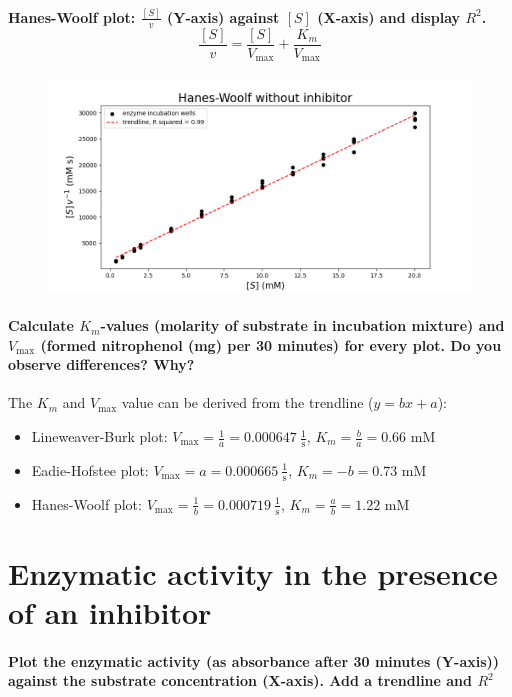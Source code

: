 \documentclass[a4paper,12pt]{article}
\begin{document}
\paragraph{Hanes-Woolf plot: $\frac{[S]}{v}$ (Y-axis) against $[S]$ (X-axis) and display $R^2$. \[\frac{[S]}{v}=\frac{[S]}{V_{\text{max}}}+\frac{K_m}{V_{\text{max}}}\]}

\begin{figure}[htb]
    \includegraphics[scale=0.4]{fig2_4.png}
    \centering
\end{figure}

\paragraph{Calculate $K_m$-values (molarity of substrate in incubation mixture) and $V_{\text{max}}$ (formed nitrophenol (mg) per 30 minutes) for every plot. Do you observe 
differences? Why?}

The $K_m$ and $V_{\text{max}}$ value can be derived from the trendline ($y = bx+a$):
\begin{itemize}
\item Lineweaver-Burk plot: $V_{\text{max}} = \frac{1}{a} = 0.000647\: \frac{1}{\text{s}}$, $K_m = \frac{b}{a} = 0.66$ mM
\item Eadie-Hofstee plot: $V_{\text{max}} = a = 0.000665\: \frac{1}{\text{s}}$, $K_m = -b = 0.73$ mM
\item Hanes-Woolf plot: $V_{\text{max}} = \frac{1}{b} = 0.000719\: \frac{1}{\text{s}}$, $K_m = \frac{a}{b} = 1.22$ mM
\end{itemize}

\section{Enzymatic activity in the presence of an inhibitor}

\paragraph{Plot the enzymatic activity (as absorbance after 30 minutes (Y-axis)) 
against the substrate concentration (X-axis). Add a trendline and $R^2$}
\end{document}
